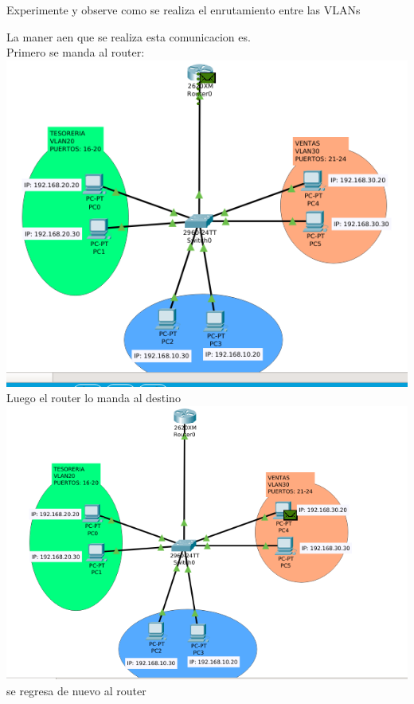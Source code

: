 \begin{definicion}[]{
Experimente y observe como se realiza el enrutamiento entre
las VLANs
}
\end{definicion}
La maner aen que se realiza esta comunicacion es.\\
Primero se manda al router:\\
\includegraphics[scale=0.5]{img/1.png} \\
Luego el router lo manda al destino\\
\includegraphics[scale=0.5]{img/2.png} \\
se regresa de nuevo al router\\
